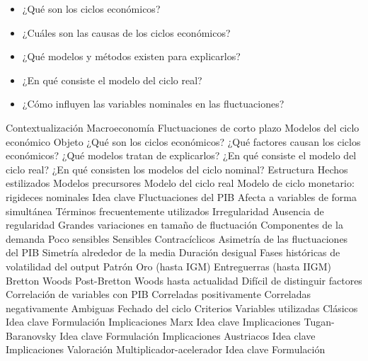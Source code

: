 \documentclass{nuevotema}
\begin{document}
\ideaclave


\begin{itemize}
	\item ¿Qué son los ciclos económicos?
	\item ¿Cuáles son las causas de los ciclos económicos?
	\item ¿Qué modelos y métodos existen para explicarlos?
	\item ¿En qué consiste el modelo del ciclo real?
	\item ¿Cómo influyen las variables nominales en las fluctuaciones?
\end{itemize}

\esquemacorto

\begin{esquema}[enumerate]
	\1[] 
		\2 Contextualización
			\3 Macroeconomía
			\3 Fluctuaciones de corto plazo
			\3 Modelos del ciclo económico
		\2 Objeto
			\3 ¿Qué son los ciclos económicos?
			\3 ¿Qué factores causan los ciclos económicos?
			\3 ¿Qué modelos tratan de explicarlos?
			\3 ¿En qué consiste el modelo del ciclo real?
			\3 ¿En qué consisten los modelos del ciclo nominal?
		\2 Estructura
			\3 Hechos estilizados
			\3 Modelos precursores
			\3 Modelo del ciclo real
			\3 Modelo de ciclo monetario: rigideces nominales
	\1 
		\2 Idea clave
			\3 Fluctuaciones del PIB
			\3 Afecta a variables de forma simultánea
			\3 Términos frecuentemente utilizados
		\2 Irregularidad
			\3 Ausencia de regularidad
			\3 Grandes variaciones en tamaño de fluctuación
		\2 Componentes de la demanda
			\3 Poco sensibles
			\3 Sensibles
			\3 Contracíclicos
		\2 Asimetría de las fluctuaciones del PIB
			\3 Simetría alrededor de la media
			\3 Duración desigual
		\2 Fases históricas de volatilidad del output
			\3 Patrón Oro (hasta IGM)
			\3 Entreguerras (hasta IIGM)
			\3 Bretton Woods
			\3 Post-Bretton Woods hasta actualidad
			\3 Difícil de distinguir factores
		\2 Correlación de variables con PIB
			\3 Correladas positivamente
			\3 Correladas negativamente
			\3 Ambiguas
		\2 Fechado del ciclo
			\3 Criterios
			\3 Variables utilizadas
	\1 
		\2 Clásicos
			\3 Idea clave
			\3 Formulación
			\3 Implicaciones
		\2 Marx
			\3 Idea clave
			\3 Implicaciones
		\2 Tugan-Baranovsky
			\3 Idea clave
			\3 Formulación
			\3 Implicaciones
		\2 Austriacos
			\3 Idea clave
			\3 Implicaciones
			\3 Valoración
		\2 Multiplicador-acelerador
			\3 Idea clave
			\3 Formulación

\end{esquema}
\end{document}
